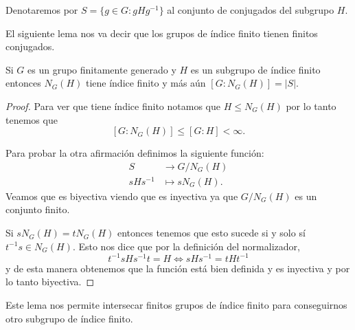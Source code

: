 \documentclass[tesis.tex]{subfiles}
\begin{document}
Denotaremos por $S= \{ g \in G :  gHg^{-1} \}$ al conjunto de conjugados del subgrupo $H$. 

El siguiente lema nos va decir que los grupos de índice finito tienen finitos conjugados.

\begin{lema}\label{lema_normalizador_conjugados}
	Si $G$ es un grupo finitamente generado y $H$ es un subgrupo de índice finito entonces $N_G(H)$ tiene índice finito y más aún $[G:N_G(H)] = |S|$.
\end{lema}
\begin{proof}
	Para ver que tiene índice finito notamos que $H \le N_G(H)$ por lo tanto tenemos que 
	\[
	[G:N_G(H)] \le [G:H] < \infty.
	\]
	
	Para probar la otra afirmación definimos la siguiente función:
	\begin{align*}
		S  &\to  G/N_G(H)  \\
		sHs^{-1} &\mapsto sN_G(H).
	\end{align*}
	Veamos que es biyectiva viendo que es inyectiva ya que $G/N_{G}(H)$ es un conjunto finito.
	
	Si $sN_G(H) = tN_G(H)$ entonces tenemos que esto sucede si y solo sí $t^{-1}s \in N_G(H)$.
	Esto nos dice que por la definición del normalizador,
	\[
	t^{-1}s H s^{-1}t = H \iff sHs^{-1} = tHt^{-1}
	\]
	y de esta manera obtenemos que la función está bien definida y es inyectiva y por lo tanto biyectiva.
	
\end{proof}

Este lema nos permite intersecar finitos grupos de índice finito para conseguirnos otro subgrupo de índice finito. 
\end{document}

